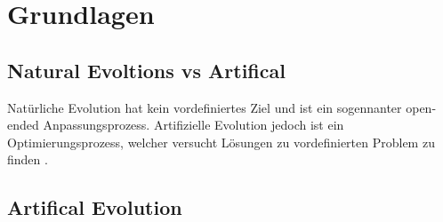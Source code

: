%
%


\chapter{Grundlagen}

\section{Natural Evoltions vs Artifical}
  Natürliche Evolution hat kein vordefiniertes Ziel und ist ein sogennanter open-ended Anpassungsprozess. Artifizielle Evolution jedoch ist ein Optimierungsprozess, welcher versucht Lösungen zu vordefinierten Problem zu finden \cite[S.1]{book:bioInspired}. \\

\section{Artifical Evolution}

